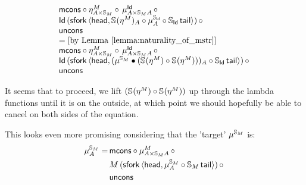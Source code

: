 \documentclass{article}
\begin{document}
$$\begin{array}{ll}
	 \mathsf{mcons} \circ \eta^M_{A \times \mathbb{S}_{M}} \circ\, \mu^{\mathsf{Id}}_{A \times \mathbb{S}_{M}A}\, \circ\, \\ 
	 \mathsf{Id}\,(\mathsf{sfork}\,\langle \mathsf{head}, \mathbb{S}_{}(\eta^M)_A \circ \mu^{\mathbb{S}_{\mathsf{Id}}}_A \circ \mathbb{S}_{\mathsf{Id}}\,\mathsf{tail} \rangle)\, \circ\, \\
	 \mathsf{uncons} \\
	 = \text{[by Lemma \ref{lemma:naturality_of_mstr}]}\\
	 \mathsf{mcons} \circ \eta^M_{A \times \mathbb{S}_{M}} \circ\, \mu^{\mathsf{Id}}_{A \times \mathbb{S}_{M}A}\, \circ\, \\ 
	 \mathsf{Id}\,(\mathsf{sfork}\,\langle \mathsf{head}, (\mu^{\mathbb{S}_{M}} \bullet (\mathbb{S}_{}(\eta^M) \circ \mathbb{S}_{}(\eta^M)))_A \circ \mathbb{S}_{\mathsf{Id}}\,\mathsf{tail} \rangle)\, \circ\, \\
	 \mathsf{uncons} \\
\end{array}
$$

It seems that to proceed, we lift $(\mathbb{S}_{}(\eta^M) \circ \mathbb{S}_{}(\eta^M))$ up through the lambda functions until it is on the outside, at which point we should hopefully be able to cancel on both sides of the equation. 

This looks even more promising considering that the 'target' $\mu^{\mathbb{S}_{M}}$ is:
\begin{align*}
	\mu^{\mathbb{S}_{M}}_A =\, &\mathsf{mcons} \circ \mu^M_{A \times \mathbb{S}_{M}A}\, \circ\, \\
	&M\,(\mathsf{sfork}\,\langle \mathsf{head}, \mu^{\mathbb{S}_{M}}_A \circ \mathbb{S}_{M}\,\mathsf{tail} \rangle)\, \circ\, \\
	&\mathsf{uncons}
\end{align*}
\end{document}
